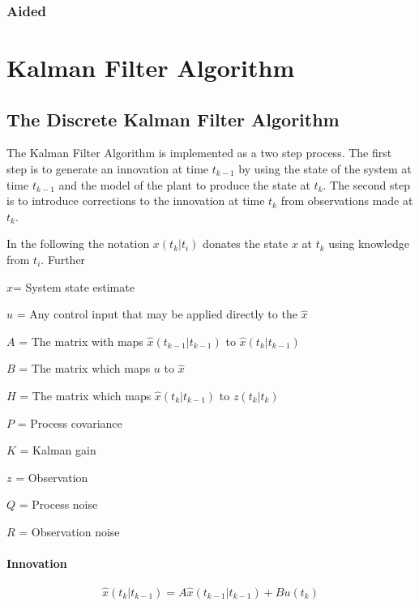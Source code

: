 \documentclass[a4paper]{report}
\numberwithin{equation}{chapter}
\begin{document}
\subsection[Aided]{Aided}

\appendix

\clearpage\setcounter{page}{1}
\chapter[Kalman Filter Algorithm]{Kalman Filter Algorithm}

\section[The Discrete Kalman Filter Algorithm]{The Discrete Kalman Filter Algorithm}

The Kalman Filter Algorithm is implemented as a two step process. The first step is to generate an innovation at time $t_{k-1}$ by using the state of the system at time $t_{k - 1}$ and the model of the plant to produce the state at $t_k$. The second step is to introduce corrections to the innovation at time $t_k$ from observations made at $t_k$.

\bigskip

In the following the notation $x \left( t_k|t_i \right)$ donates the state $x$ at $t_k$ using knowledge from $t_i$. Further

$\hat{x}$= System state estimate

$u$ = Any control input that may be applied directly to the $\hat{x}$

$A$ = The matrix with maps $\hat{x} \left( t_{k - 1}|t_{k - 1} \right)$ to $\hat{x} \left( t_k|t_{k - 1} \right)$

$B$ = The matrix which maps $u$ to $\hat{x}$

$H$ = The matrix which maps $\hat{x} \left( t_k|t_{k - 1} \right)$ to $z \left( t_k|t_k \right)$

$P$ = Process covariance

$K$ = Kalman gain

$z$ = Observation

$Q$ = Process noise

$R$ = Observation noise

\subsubsection[Innovation]{Innovation}

\begin{equation}
\hat{x} \left( t_k|t_{k-1} \right) = A\hat{x} \left( t_{k-1}|t_{k-1} \right) + Bu \left( t_k \right)
\end{equation}
\end{document}
